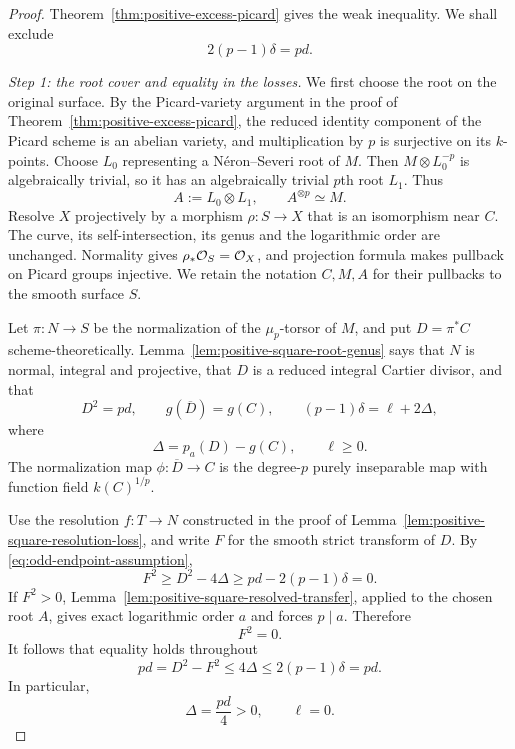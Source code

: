 \begin{proof}
Theorem~\ref{thm:positive-excess-picard} gives the weak inequality.
We shall exclude
\begin{equation}\label{eq:odd-endpoint-assumption}
 2(p-1)\delta=pd.
\end{equation}

\emph{Step 1: the root cover and equality in the losses.}
We first choose the root on the original surface.
By the Picard-variety argument in the proof of
Theorem~\ref{thm:positive-excess-picard}, the reduced identity
component of the Picard scheme is an abelian variety, and
multiplication by $p$ is surjective on its $k$-points.
Choose $L_0$ representing a N\'eron--Severi root of $M$.
Then $M\otimes L_0^{-p}$ is algebraically trivial, so it has
an algebraically trivial $p$th root $L_1$.
Thus
\[
 A:=L_0\otimes L_1,\qquad A^{\otimes p}\simeq M.
\]
Resolve $X$ projectively by a morphism $\rho:S\to X$ that is an
isomorphism near $C$.
The curve, its self-intersection, its genus and the logarithmic
order are unchanged.
Normality gives $\rho_*\mathcal O_S=\mathcal O_X$, and projection formula makes
pullback on Picard groups injective.
We retain the notation $C,M,A$ for their pullbacks to the smooth
surface $S$.

Let $\pi:N\to S$ be the normalization of the $\mu_p$-torsor of $M$,
and put $D=\pi^*C$ scheme-theoretically.
Lemma~\ref{lem:positive-square-root-genus} says that $N$ is normal,
integral and projective, that $D$ is a reduced integral Cartier
divisor, and that
\[
 D^2=pd,\qquad g(\overline D)=g(C),\qquad
 (p-1)\delta=\ell+2\Delta,
\]
where
\[
 \Delta=p_a(D)-g(C),\qquad \ell\geq0.
\]
The normalization map $\phi:\overline D\to C$ is the degree-$p$
purely inseparable map with function field $k(C)^{1/p}$.

Use the resolution $f:T\to N$ constructed in the proof of
Lemma~\ref{lem:positive-square-resolution-loss}, and write $F$
for the smooth strict transform of $D$.
By \eqref{eq:odd-endpoint-assumption},
\[
 F^2\geq D^2-4\Delta
       \geq pd-2(p-1)\delta=0.
\]
If $F^2>0$, Lemma~\ref{lem:positive-square-resolved-transfer},
applied to the chosen root $A$, gives exact logarithmic order $a$
and forces $p\mid a$.
Therefore
\begin{equation}\label{eq:odd-endpoint-zero-square}
 F^2=0.
\end{equation}
It follows that equality holds throughout
\[
 pd=D^2-F^2\leq4\Delta\leq2(p-1)\delta=pd.
\]
In particular,
\begin{equation}\label{eq:odd-endpoint-genus}
 \Delta=\frac{pd}{4}>0,\qquad \ell=0.
\end{equation}


\end{proof}
